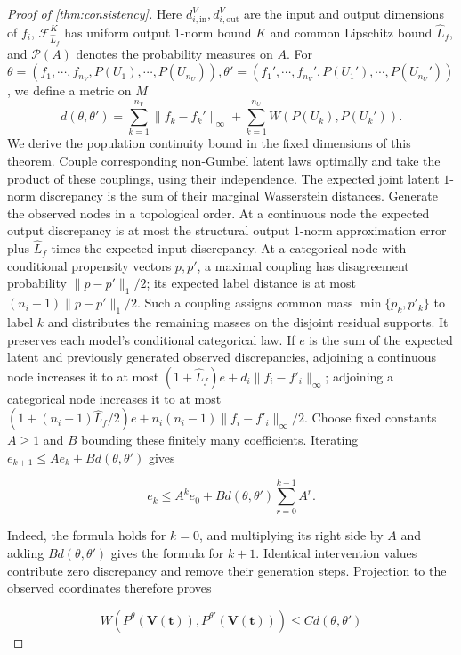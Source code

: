 \begin{proof}[Proof of \cref{thm:consistency}]
Here $d_{i,\text{in}}^V,d_{i,\text{out}}^V$ are the input and output dimensions of $f_i$, $\mathcal F_{\hat L_f}^K$ has uniform output $1$-norm bound $K$ and common Lipschitz bound $\hat L_f$, and $\mathcal P(A)$ denotes the probability measures on $A$. For $ \theta  =\left( f_{1} ,\cdots ,f_{n_{V}} ,{P}({U_{1}}) ,\cdots , {P}({U_{n_{U}}})\right) ,\theta' =\left( f_{1}' ,\cdots ,f_{n_{V}}' ,{P}({U_{1}'}) ,\cdots ,{P}({U_{n_{U}}'})\right)$, we define a metric on $ M$
\begin{equation*}
d( \theta  ,\theta') =\sum _{k=1}^{n_{V}} \| f_{k} -f_{k}' \| _{\infty } +\sum _{k=1}^{n_{U}} W(P(U_{k}),{P}({U_{k}'})) .
\end{equation*}
We derive the population continuity bound in the fixed dimensions of this theorem. Couple corresponding non-Gumbel latent laws optimally and take the product of these couplings, using their independence. The expected joint latent $1$-norm discrepancy is the sum of their marginal Wasserstein distances. Generate the observed nodes in a topological order. At a continuous node the expected output discrepancy is at most the structural output $1$-norm approximation error plus $\hat L_f$ times the expected input discrepancy. At a categorical node with conditional propensity vectors $p,p'$, a maximal coupling has disagreement probability $\|p-p'\|_1/2$; its expected label distance is at most $(n_i-1)\|p-p'\|_1/2$. Such a coupling assigns common mass $\min\{p_k,p'_k\}$ to label $k$ and distributes the remaining masses on the disjoint residual supports. It preserves each model's conditional categorical law. If $e$ is the sum of the expected latent and previously generated observed discrepancies, adjoining a continuous node increases it to at most $(1+\hat L_f)e+d_i\|f_i-f'_i\|_\infty$; adjoining a categorical node increases it to at most $(1+(n_i-1)\hat L_f/2)e+n_i(n_i-1)\|f_i-f'_i\|_\infty/2$. Choose fixed constants $A\geqslant1$ and $B$ bounding these finitely many coefficients. Iterating $e_{k+1}\leqslant Ae_k+Bd(\theta,\theta')$ gives

\[
e_k\leqslant A^ke_0+Bd(\theta,\theta')\sum_{r=0}^{k-1}A^r.
\]

Indeed, the formula holds for $k=0$, and multiplying its right side by $A$ and adding $Bd(\theta,\theta')$ gives the formula for $k+1$. Identical intervention values contribute zero discrepancy and remove their generation steps. Projection to the observed coordinates therefore proves

\[
W(P^\theta(\boldsymbol V(\boldsymbol t)),P^{\theta'}(\boldsymbol V(\boldsymbol t)))\leqslant C d(\theta,\theta')
\]


\end{proof}
